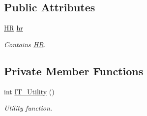 \subsection*{Public Attributes}
\begin{DoxyCompactItemize}
\item 
\mbox{\label{class_i_t___company_a9ef1fdbdfe9220c9f91fee83bfe65c29}} 
\hyperlink{class_h_r}{HR} \hyperlink{class_i_t___company_a9ef1fdbdfe9220c9f91fee83bfe65c29}{hr}
\begin{DoxyCompactList}\small\item\em Contains \hyperlink{class_h_r}{HR}. \end{DoxyCompactList}\end{DoxyCompactItemize}
\subsection*{Private Member Functions}
\begin{DoxyCompactItemize}
\item 
\mbox{\label{class_i_t___company_a06d2d0d74d96533e474618fb92291c04}} 
int \hyperlink{class_i_t___company_a06d2d0d74d96533e474618fb92291c04}{I\+T\+\_\+\+Utility} ()
\begin{DoxyCompactList}\small\item\em Utility function. \end{DoxyCompactList}\end{DoxyCompactItemize}
